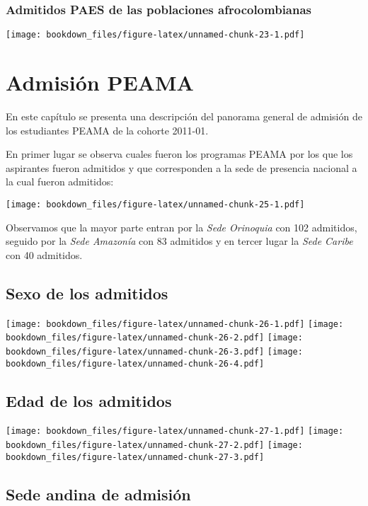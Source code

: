\documentclass[]{article}
\theoremstyle{definition}
\theoremstyle{definition}
\theoremstyle{definition}
\theoremstyle{remark}
\begin{document}
\subsubsection{Admitidos PAES de las poblaciones
afrocolombianas}\label{admitidos-paes-de-las-poblaciones-afrocolombianas-1}

\texttt{[image: bookdown\_files/figure-latex/unnamed-chunk-23-1.pdf]}

\section{Admisión PEAMA}\label{admision-peama}

En este capítulo se presenta una descripción del panorama general de
admisión de los estudiantes PEAMA de la cohorte 2011-01.

En primer lugar se observa cuales fueron los programas PEAMA por los que
los aspirantes fueron admitidos y que corresponden a la sede de
presencia nacional a la cual fueron admitidos:

\texttt{[image: bookdown\_files/figure-latex/unnamed-chunk-25-1.pdf]}

Observamos que la mayor parte entran por la \emph{Sede Orinoquia} con
102 admitidos, seguido por la \emph{Sede Amazonía} con 83 admitidos y en
tercer lugar la \emph{Sede Caribe} con 40 admitidos.

\subsection{Sexo de los admitidos}\label{sexo-de-los-admitidos-1}

\texttt{[image: bookdown\_files/figure-latex/unnamed-chunk-26-1.pdf]}
\texttt{[image: bookdown\_files/figure-latex/unnamed-chunk-26-2.pdf]}
\texttt{[image: bookdown\_files/figure-latex/unnamed-chunk-26-3.pdf]}
\texttt{[image: bookdown\_files/figure-latex/unnamed-chunk-26-4.pdf]}

\subsection{Edad de los admitidos}\label{edad-de-los-admitidos-1}

\texttt{[image: bookdown\_files/figure-latex/unnamed-chunk-27-1.pdf]}
\texttt{[image: bookdown\_files/figure-latex/unnamed-chunk-27-2.pdf]}
\texttt{[image: bookdown\_files/figure-latex/unnamed-chunk-27-3.pdf]}

\subsection{Sede andina de admisión}\label{sede-andina-de-admision}
\end{document}
